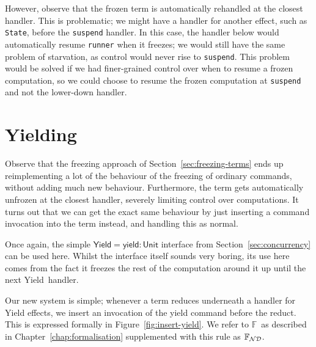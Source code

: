 \documentclass[msc,deptreport,cs]{infthesis} %
\newcommand{\code}[1]{\lstinline{#1}}
\newcommand\nondetfrank{$\mathbb{F}_{\cal{ND}}$}
\newcommand\purefrank{$\mathbb{F}$}
\newcommand\yield{\textsf{yield}\xspace}
\newcommand\Yield{\textsf{Yield}\xspace}
\newcommand{\todo}[1]
           {{\par\noindent\small\color{RoyalPurple}
  \framebox{\parbox{\dimexpr\linewidth-2\fboxsep-2\fboxrule}
    {\textbf{TODO:} #1}}}}
\begin{document}
However, observe that the frozen term is automatically rehandled at the closest
handler. This is problematic; we might have a handler for another effect, such
as \code{State}, before the \code{suspend} handler. In this case, the handler
below would automatically resume \code{runner} when it freezes; we would still
have the same problem of starvation, as control would never rise to
\code{suspend}. This problem would be solved if we had finer-grained control
over when to resume a frozen computation, so we could choose to resume the frozen computation at \code{suspend} and not the lower-down handler.


\section{Yielding}
\label{sec:inserting-yields}

Observe that the freezing approach of Section~\ref{sec:freezing-terms} ends up
reimplementing a lot of the behaviour of the freezing of ordinary commands,
without adding much new behaviour. Furthermore, the term gets automatically
unfrozen at the closest handler, severely limiting control over computations. It
turns out that we can get the exact same behaviour by just inserting a command
invocation into the term instead, and handling this as normal.
%

Once again, the simple $\Yield = \yield : \textsf{Unit}$ interface from
Section~\ref{sec:concurrency} can be used here. Whilst the interface itself
sounds very boring, its use here comes from the fact it freezes the rest of the
computation around it up until the next \Yield~handler.


Our new system is simple; whenever a term reduces underneath a handler for
\Yield effects, we insert an invocation of the \yield command before the reduct.
This is expressed formally in Figure~\ref{fig:insert-yield}. We refer to
\purefrank~as described in Chapter~\ref{chap:formalisation} supplemented with
this rule as \nondetfrank.
\end{document}
